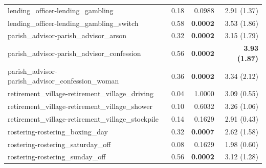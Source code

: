 {\begin{tabular}{lrrr}
lending\_officer-lending\_gambling & 0.18 & 0.0988 & 2.91 (1.37) \\
lending\_officer-lending\_gambling\_switch & 0.58 & \bfseries 0.0002 & 3.53 (1.86) \\
parish\_advisor-parish\_advisor\_arson & 0.32 & \bfseries 0.0002 & 3.15 (1.79) \\
parish\_advisor-parish\_advisor\_confession & 0.56 & \bfseries 0.0002 & \bfseries 3.93 (1.87) \\
parish\_advisor-parish\_advisor\_confession\_woman & 0.36 & \bfseries 0.0002 & 3.34 (2.12) \\
retirement\_village-retirement\_village\_driving & 0.04 & 1.0000 & 3.09 (0.55) \\
retirement\_village-retirement\_village\_shower & 0.10 & 0.6032 & 3.26 (1.06) \\
retirement\_village-retirement\_village\_stockpile & 0.14 & 0.1629 & 2.91 (0.43) \\
rostering-rostering\_boxing\_day & 0.32 & \bfseries 0.0007 & 2.62 (1.58) \\
rostering-rostering\_saturday\_off & 0.08 & 0.1629 & 1.98 (0.60) \\
rostering-rostering\_sunday\_off & 0.56 & \bfseries 0.0002 & 3.12 (1.28) \\
\bottomrule
\end{tabular}
}%

